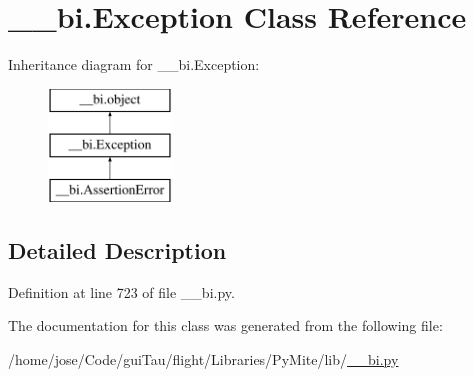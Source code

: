 \hypertarget{class____bi_1_1_exception}{\section{\-\_\-\-\_\-bi.\-Exception Class Reference}
\label{class____bi_1_1_exception}
}
Inheritance diagram for \-\_\-\-\_\-bi.\-Exception\-:\begin{figure}[H]
\begin{center}
\leavevmode
\includegraphics[height=3.000000cm]{class____bi_1_1_exception}
\end{center}
\end{figure}


\subsection{Detailed Description}


Definition at line 723 of file \-\_\-\-\_\-bi.\-py.



The documentation for this class was generated from the following file\-:\begin{DoxyCompactItemize}
\item 
/home/jose/\-Code/gui\-Tau/flight/\-Libraries/\-Py\-Mite/lib/\hyperlink{____bi_8py}{\-\_\-\-\_\-bi.\-py}\end{DoxyCompactItemize}
